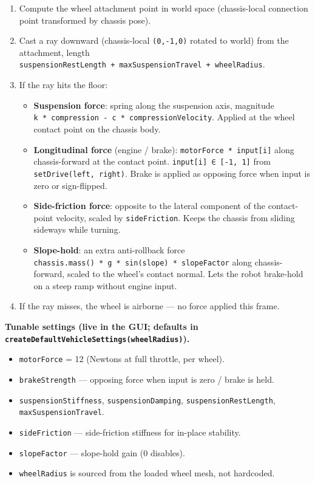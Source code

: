 \documentclass[
]{article}
\providecommand{\tightlist}{%
  \setlength{\itemsep}{0pt}\setlength{\parskip}{0pt}}
\begin{document}
\begin{enumerate}
\def\labelenumi{\arabic{enumi}.}
\tightlist
\item
  Compute the wheel attachment point in world space (chassis-local
  connection point transformed by chassis pose).
\item
  Cast a ray downward (chassis-local \texttt{(0,-1,0)} rotated to world)
  from the attachment, length
  \texttt{suspensionRestLength\ +\ maxSuspensionTravel\ +\ wheelRadius}.
\item
  If the ray hits the floor:

  \begin{itemize}
  \tightlist
  \item
    \textbf{Suspension force}: spring along the suspension axis,
    magnitude \texttt{k\ *\ compression\ -\ c\ *\ compressionVelocity}.
    Applied at the wheel contact point on the chassis body.
  \item
    \textbf{Longitudinal force} (engine / brake):
    \texttt{motorForce\ *\ input{[}i{]}} along chassis-forward at the
    contact point. \texttt{input{[}i{]}\ ∈\ {[}-1,\ 1{]}} from
    \texttt{setDrive(left,\ right)}. Brake is applied as opposing force
    when input is zero or sign-flipped.
  \item
    \textbf{Side-friction force}: opposite to the lateral component of
    the contact-point velocity, scaled by \texttt{sideFriction}. Keeps
    the chassis from sliding sideways while turning.
  \item
    \textbf{Slope-hold}: an extra anti-rollback force
    \texttt{chassis.mass()\ *\ g\ *\ sin(slope)\ *\ slopeFactor} along
    chassis-forward, scaled to the wheel's contact normal. Lets the
    robot brake-hold on a steep ramp without engine input.
  \end{itemize}
\item
  If the ray misses, the wheel is airborne --- no force applied this
  frame.
\end{enumerate}

\textbf{Tunable settings (live in the GUI; defaults in
\texttt{createDefaultVehicleSettings(wheelRadius)}).}

\begin{itemize}
\tightlist
\item
  \texttt{motorForce} = 12 (Newtons at full throttle, per wheel).
\item
  \texttt{brakeStrength} --- opposing force when input is zero / brake
  is held.
\item
  \texttt{suspensionStiffness}, \texttt{suspensionDamping},
  \texttt{suspensionRestLength}, \texttt{maxSuspensionTravel}.
\item
  \texttt{sideFriction} --- side-friction stiffness for in-place
  stability.
\item
  \texttt{slopeFactor} --- slope-hold gain (0 disables).
\item
  \texttt{wheelRadius} is sourced from the loaded wheel mesh, not
  hardcoded.
\end{itemize}
\end{document}
